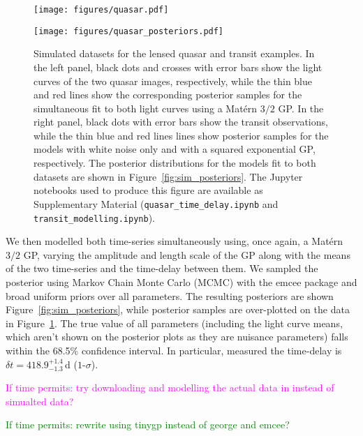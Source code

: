 \documentclass[letterpaper]{ar-1col}
\newcommand{\suz}[1]{\textcolor{magenta}{#1}}
\newcommand{\dan}[1]{\textcolor{green}{#1}}
\begin{document}
\begin{figure}[ht]
  \centering
  \begin{minipage}[t]{0.5\linewidth}
    \texttt{[image: figures/quasar.pdf]}
  \end{minipage} \hfill
  \begin{minipage}[t]{0.44\linewidth}
    \texttt{[image: figures/quasar\_posteriors.pdf]}
  \end{minipage}
  \caption{Simulated datasets for the lensed quasar and transit examples. In the left panel, black dots and crosses with error bars show the light curves of the two quasar images, respectively, while the thin blue and red lines show the corresponding posterior samples for the simultaneous fit to both light curves using a Mat{\'e}rn $3/2$ GP.  In the right panel, black dots with error bars show the transit observations, while the thin blue and red lines lines show posterior samples for the models with white noise only and with a squared exponential GP, respectively. The posterior distributions for the models fit to both datasets are shown in Figure~\protect\ref{fig:sim_posteriors}. The {\sc Jupyter} notebooks used to produce this figure are available as Supplementary Material (\texttt{quasar\_time\_delay.ipynb} and \texttt{transit\_modelling.ipynb}).}
  \label{fig:sim_lcs}
\end{figure}

We then modelled both time-series simultaneously using, once again, a Mat{\'e}rn $3/2$ GP, varying the amplitude and length scale of the GP along with the means of the two time-series and the time-delay between them. We sampled the posterior using Markov Chain Monte Carlo (MCMC) with the {\sc emcee} package \citep{emcee} and broad uniform priors over all parameters. The resulting posteriors are shown Figure~\ref{fig:sim_posteriors}, while posterior samples are over-plotted on the data in Figure~\ref{fig:sim_lcs}. The true value of all parameters (including the light curve means, which aren't shown on the posterior plots as they are nuisance parameters) falls within the 68.5\% confidence interval. In particular, measured the time-delay is $\delta t = 418.9_{-1.3}^{+1.4}$\,d ($1$-$\sigma$).

\suz{If time permits: try downloading and modelling the actual data in \citet{1989A&A...215....1V} instead of simualted data?}

\dan{If time permits: rewrite using {\sc tinygp} instead of {\sc george} and {\sc emcee}?}
\end{document}
